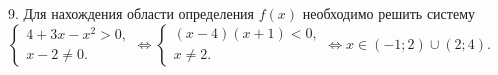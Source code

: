 9. Для нахождения области определения $f(x)$ необходимо решить систему $\begin{cases} 4+3x-x^2>0,\\ x-2\neq0.\end{cases}\Leftrightarrow
\begin{cases} (x-4)(x+1)<0,\\ x\neq2.\end{cases}\Leftrightarrow x\in(-1;2)\cup(2;4).$\\
